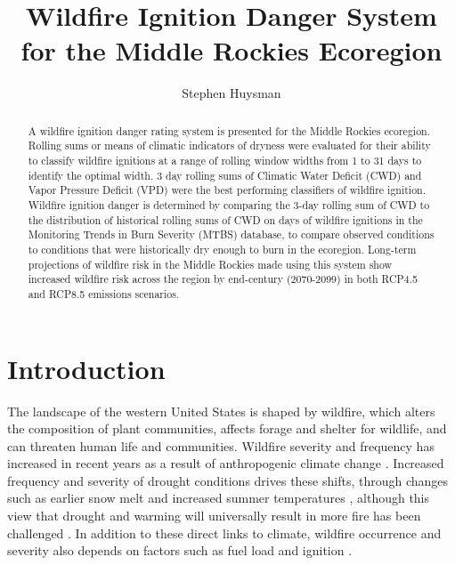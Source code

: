 \documentclass[11pt]{article}
\author{Stephen Huysman}
\title{Wildfire Ignition Danger System for the Middle Rockies Ecoregion}
\begin{document}
\maketitle


\begin{abstract}
A wildfire ignition danger rating system is presented for the Middle Rockies ecoregion. Rolling sums or means of climatic indicators of dryness were evaluated for their ability to classify wildfire ignitions at a range of rolling window widths from 1 to 31 days to identify the optimal width.  3 day rolling sums of Climatic Water Deficit (CWD) and Vapor Pressure Deficit (VPD) were the best performing classifiers of wildfire ignition. Wildfire ignition danger is determined by comparing the 3-day rolling sum of CWD to the distribution of historical rolling sums of CWD on days of wildfire ignitions in the Monitoring Trends in Burn Severity (MTBS) database, to compare observed conditions to conditions that were historically dry enough to burn in the ecoregion. Long-term projections of wildfire risk in the Middle Rockies made using this system show increased wildfire risk across the region by end-century (2070-2099) in both RCP4.5 and RCP8.5 emissions scenarios.
  
\end{abstract}

\section{Introduction}

The landscape of the western United States is shaped by wildfire, which alters the composition of plant communities, affects forage and shelter for wildlife, and can threaten human life and communities.  Wildfire severity and frequency has increased in recent years as a result of anthropogenic climate change \citep{abatzoglouImpactAnthropogenicClimate2016}.  Increased frequency and severity of drought conditions drives these shifts, through changes such as earlier snow melt \citep{tercekForecasts21stCentury2016} and increased summer temperatures \citep{runningGlobalWarmingCausing2006}, although this view that drought and warming will universally result in more fire has been challenged \citep{littellClimateChangeFuture2018}.  In addition to these direct links to climate, wildfire occurrence and severity also depends on factors such as fuel load and ignition \citep{mckenzieClimateChangeEcohydrology2017}.
\end{document}
